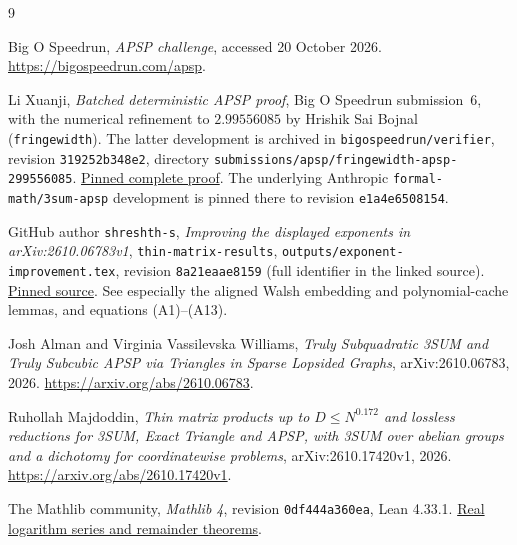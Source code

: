 \documentclass[11pt,a4paper]{article}
\begin{document}
\begin{thebibliography}{9}\small\raggedright
{}
Big O Speedrun, \emph{APSP challenge}, accessed 20 October 2026.
\url{https://bigospeedrun.com/apsp}.

Li Xuanji, \emph{Batched deterministic APSP proof}, Big O Speedrun
submission~6, with the numerical refinement to $2.99556085$ by
Hrishik Sai Bojnal (\texttt{fringewidth}). The latter development is
archived in \texttt{bigospeedrun/verifier}, revision
\texttt{319252b348e2}, directory
\texttt{submissions/apsp/fringewidth-apsp-299556085}.
\href{https://github.com/bigospeedrun/verifier/tree/319252b348e254a4257cdc69805fd6eec3f5cd94/submissions/apsp/fringewidth-apsp-299556085}{Pinned complete proof}.
The underlying Anthropic \texttt{formal-math/3sum-apsp} development
is pinned there to revision \texttt{e1a4e6508154}.

GitHub author \texttt{shreshth-s}, \emph{Improving the displayed
exponents in arXiv:2610.06783v1}, \texttt{thin-matrix-results},
\texttt{outputs/exponent-improvement.tex}, revision
\texttt{8a21eaae8159} (full identifier in the linked source).
\href{https://github.com/shreshth-s/thin-matrix-results/blob/8a21eaae81599913dba562727e03a9b48c36a5b9/outputs/exponent-improvement.tex}{Pinned source}.
See especially the aligned Walsh embedding and polynomial-cache lemmas,
and equations (A1)--(A13).

Josh Alman and Virginia Vassilevska Williams,
\emph{Truly Subquadratic 3SUM and Truly Subcubic APSP via Triangles in
Sparse Lopsided Graphs}, arXiv:2610.06783, 2026.
\url{https://arxiv.org/abs/2610.06783}.

Ruhollah Majdoddin, \emph{Thin matrix products up to
$D\le N^{0.172}$ and lossless reductions for 3SUM, Exact Triangle and
APSP, with 3SUM over abelian groups and a dichotomy for coordinatewise
problems}, arXiv:2610.17420v1, 2026.
\url{https://arxiv.org/abs/2610.17420v1}.

The Mathlib community, \emph{Mathlib 4}, revision
\texttt{0df444a360ea}, Lean 4.33.1.
\href{https://github.com/leanprover-community/mathlib4/blob/0df444a360eaa60ab8c11dca51a86af692955474/Mathlib/Analysis/SpecialFunctions/Log/Deriv.lean}{Real logarithm series and remainder theorems}.
\end{thebibliography}
\end{document}
